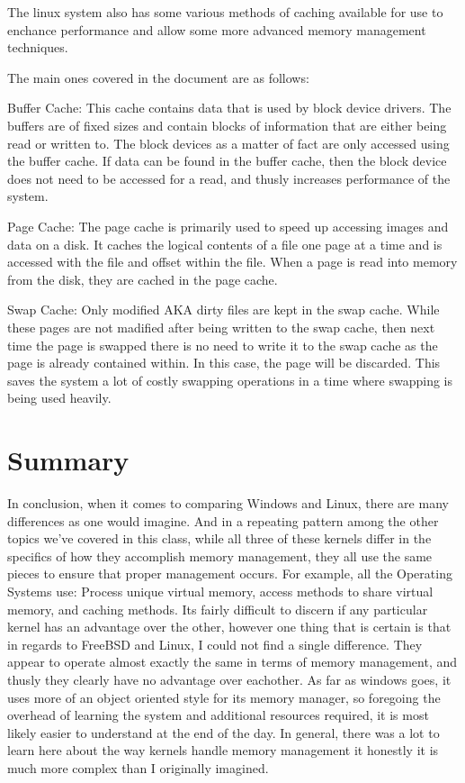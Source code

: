 \documentclass[10pt,draftclsnofoot,onecolumn]{IEEEtran}
\begin{document}
The linux system also has some various methods of caching available for use to
enchance performance and allow some more advanced memory management techniques.

The main ones covered in the document are as follows:

Buffer Cache: This cache contains data that is used by block device drivers. The
buffers are of fixed sizes and contain blocks of information that are either
being read or written to. The block devices as a matter of fact are only accessed
using the buffer cache. If data can be found in the buffer cache, then the block
device does not need to be accessed for a read, and thusly increases performance
of the system.

Page Cache: The page cache is primarily used to speed up accessing images and
data on a disk. It caches the logical contents of a file one page at a time and
is accessed with the file and offset within the file. When a page is read into
memory from the disk, they are cached in the page cache.

Swap Cache: Only modified AKA dirty files are kept in the swap cache. While
these pages are not madified after being written to the swap cache, then next
time the page is swapped there is no need to write it to the swap cache as the
page is already contained within. In this case, the page will be discarded. This
saves the system a lot of costly swapping operations in a time where swapping is
being used heavily.



\newpage
\section{Summary}

In conclusion, when it comes to comparing Windows and Linux, there are many
differences as one would imagine. And in a repeating pattern among the other
topics we've covered in this class, while all three of these kernels differ in
the specifics of how they accomplish memory management, they all use the same
pieces to ensure that proper management occurs. For example, all the Operating
Systems use: Process unique virtual memory, access methods to share virtual
memory, and caching methods. Its fairly difficult to discern if any particular
kernel has an advantage over the other, however one thing that is certain is that
in regards to FreeBSD and Linux, I could not find a single difference. They
appear to operate almost exactly the same in terms of memory management, and
thusly they clearly have no advantage over eachother. As far as windows goes, it
uses more of an object oriented style for its memory manager, so foregoing the
overhead of learning the system and additional resources required, it is most
likely easier to understand at the end of the day. In general, there was a lot to
learn here about the way kernels handle memory management it honestly it is
much more complex than I originally imagined.
\end{document}
